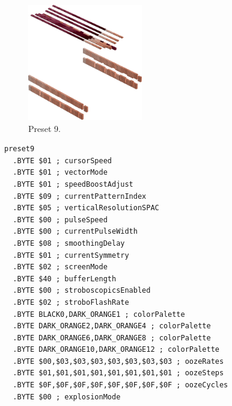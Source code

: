 \clearpage
\begin{minipage}[b]{0.48\linewidth}
\begin{figure}[H]                                                          
  \centering                                                             
  \begin{adjustbox}{width=5cm,center}                                   
  \includegraphics[width=5cm]{src/colorspace_presets/preset9-45.png}%
  \end{adjustbox}                                                        
\caption*{Preset 9.}                                           
\end{figure}                                                               
\end{minipage}
\hspace{0.1cm}
\begin{minipage}[b]{0.48\linewidth}                            
\begin{lstlisting}[basicstyle=\ttfamily\tiny]
preset9
  .BYTE $01 ; cursorSpeed
  .BYTE $01 ; vectorMode
  .BYTE $01 ; speedBoostAdjust
  .BYTE $09 ; currentPatternIndex
  .BYTE $05 ; verticalResolutionSPAC
  .BYTE $00 ; pulseSpeed
  .BYTE $00 ; currentPulseWidth
  .BYTE $08 ; smoothingDelay
  .BYTE $01 ; currentSymmetry
  .BYTE $02 ; screenMode
  .BYTE $40 ; bufferLength
  .BYTE $00 ; stroboscopicsEnabled
  .BYTE $02 ; stroboFlashRate
  .BYTE BLACK0,DARK_ORANGE1 ; colorPalette
  .BYTE DARK_ORANGE2,DARK_ORANGE4 ; colorPalette
  .BYTE DARK_ORANGE6,DARK_ORANGE8 ; colorPalette
  .BYTE DARK_ORANGE10,DARK_ORANGE12 ; colorPalette
  .BYTE $00,$03,$03,$03,$03,$03,$03,$03 ; oozeRates
  .BYTE $01,$01,$01,$01,$01,$01,$01,$01 ; oozeSteps
  .BYTE $0F,$0F,$0F,$0F,$0F,$0F,$0F,$0F ; oozeCycles
  .BYTE $00 ; explosionMode
\end{lstlisting}
\end{minipage}

\vspace*{0.3cm}

